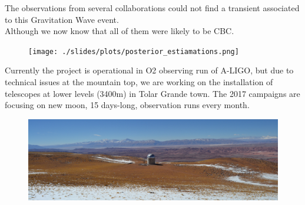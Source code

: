\documentclass[10pt]{beamer}
\begin{document}
\begin{frame}
 The observations from several collaborations could not find
 a transient associated to this Gravitation Wave event.\\
 
Although we now know that all of them were likely to be CBC.
\begin{figure}
 \centering
 \texttt{[image: ./slides/plots/posterior\_estiamations.png]}
 \label{fig:posterior}
\end{figure}

\end{frame}

\begin{frame}
Currently the project is operational in O2 observing run of A-LIGO, but
due to technical issues at the mountain top, we are working on the installation 
of telescopes at lower levels (3400m) in Tolar Grande town.
The 2017 campaigns are focusing on new moon, 15 days-long, observation
runs every month. 

\begin{figure}
 \centering
 \includegraphics[width=1.\textwidth]{./slides/plots/macon.png}
\end{figure}

\end{frame}
\end{document}
